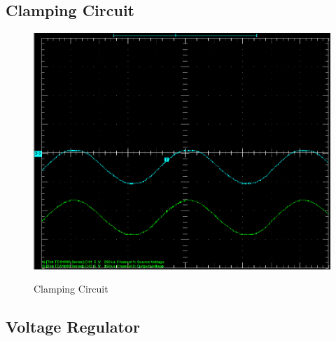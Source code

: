 \documentclass[twocolumn,english]{IEEEtran}
\begin{document}
\subsection{\textbf{Clamping Circuit}}
\begin{figure}[h!]
  \begin{centering}
  \begin{center}
  \includegraphics[width=\linewidth]{./clamping_results.png}
  \label{fig:clamping_results}
  \caption{Clamping Circuit}
  \end{center}
  \par\end{centering}
  \end{figure}


\subsection{\textbf{Voltage Regulator}}
\end{document}
